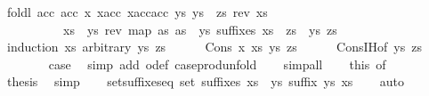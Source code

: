 \begin{isabellebody}
\ {\isachardoublequoteopen}foldl\ {\isacharparenleft}{\isasymlambda}{\isacharparenleft}acc{}{\isacharcomma}\ acc{}{\isacharparenright}\ x{\isachardot}\ {\isacharparenleft}x{\isacharhash}acc{}{\isacharcomma}\ {\isacharparenleft}x{\isacharhash}acc{}{\isacharparenright}{\isacharhash}acc{}{\isacharparenright}{\isacharparenright}\ {\isacharparenleft}ys{\isacharcomma}\ ys\ {\isacharhash}\ zs{\isacharparenright}\ {\isacharparenleft}rev\ xs{\isacharparenright}\ {\isacharequal}\isanewline
\ \ \ \ \ \ \ \ \ \ {\isacharparenleft}xs\ {\isacharat}\ ys{\isacharcomma}\ rev\ {\isacharparenleft}map\ {\isacharparenleft}{\isasymlambda}as{\isachardot}\ as\ {\isacharat}\ ys{\isacharparenright}\ {\isacharparenleft}suffixes\ xs{\isacharparenright}{\isacharparenright}\ {\isacharat}\ zs{\isacharparenright}{\isachardoublequoteclose}\ \ ys\ zs\isanewline
\ \ \isamarkupfalse%
\ {\isacharparenleft}induction\ xs\ arbitrary{\isacharcolon}\ ys\ zs{\isacharparenright}\isanewline
\ \ \ \ \isamarkupfalse%
\ {\isacharparenleft}Cons\ x\ xs\ ys\ zs{\isacharparenright}\isanewline
\ \ \ \ \isamarkupfalse%
\ Cons{\isachardot}IH{\isacharbrackleft}of\ ys\ zs{\isacharbrackright}\isanewline
\ \ \ \ \ \ \isamarkupfalse%
\ {\isacharquery}case\ \isamarkupfalse%
\ {\isacharparenleft}simp\ add{\isacharcolon}\ o{\isacharunderscore}def\ case{\isacharunderscore}prod{\isacharunderscore}unfold{\isacharparenright}\isanewline
\ \ \isamarkupfalse%
\ simp{\isacharunderscore}all\isanewline
\ \ \isamarkupfalse%
\ this\ {\isacharbrackleft}of\ {\isachardoublequoteopen}{\isacharbrackleft}{\isacharbrackright}{\isachardoublequoteclose}\ {\isachardoublequoteopen}{\isacharbrackleft}{\isacharbrackright}{\isachardoublequoteclose}{\isacharbrackright}\ \isamarkupfalse%
\ {\isacharquery}thesis\ \isamarkupfalse%
\ simp\isanewline
{}\isamarkupfalse%
%
\endisatagproof
{\isafoldproof}%
%
\isadelimproof
\isanewline
%
\endisadelimproof
\ \ \isanewline
{}\isamarkupfalse%
\ set{\isacharunderscore}suffixes{\isacharunderscore}eq{\isacharcolon}\ {\isachardoublequoteopen}set\ {\isacharparenleft}suffixes\ xs{\isacharparenright}\ {\isacharequal}\ {\isacharbraceleft}ys{\isachardot}\ suffix\ ys\ xs{\isacharbraceright}{\isachardoublequoteclose}\isanewline
%
\isadelimproof
\ \ %
\endisadelimproof
%
\isatagproof
{}\isamarkupfalse%
\ auto%
\endisatagproof
{\isafoldproof}%
%
\isadelimproof

\end{isabellebody}
